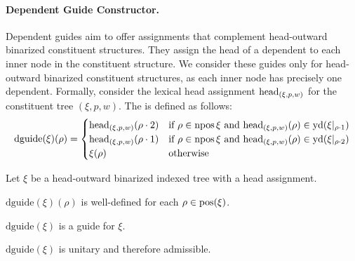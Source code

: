 \documentclass[../../document.tex]{subfiles}
\begin{document}
    \paragraph{Dependent Guide Constructor.}
    Dependent guides aim to offer assignments that complement head-outward binarized constituent structures.
    They assign the head of a dependent to each inner node in the constituent structure.
    We consider these guides only for head-outward binarized constituent structures, as each inner node has precisely one dependent.
    Formally, consider the lexical head assignment \(\operatorname{head}_{(\xi,p,w)}\) for the constituent tree \((\xi, p, w)\).
    The  is defined as follows:
    \[
        \mathrm{dguide}(\xi)(\rho) = \begin{cases}
            \operatorname{head}_{(\xi,p,w)}(\rho\cdot2) & \text{if $\rho \in \operatorname{npos}{\xi}$ and $\operatorname{head}_{(\xi,p,w)}(\rho) \in \operatorname{yd}(\xi|_{\rho\cdot 1})$} \\
            \operatorname{head}_{(\xi,p,w)}(\rho\cdot1) & \text{if $\rho \in \operatorname{npos}{\xi}$ and $\operatorname{head}_{(\xi,p,w)}(\rho) \in \operatorname{yd}(\xi|_{\rho\cdot 2})$} \\
            \xi(\rho) & \text{otherwise} \\
        \end{cases}
    \]

    \begin{claim}
        Let \(\xi\) be a head-outward binarized indexed tree with a head assignment.
        \begin{compactenum}
            \item \(\mathrm{dguide}(\xi)(\rho)\) is well-defined for each \(\rho \in \operatorname{pos}(\xi)\).
            \item \(\mathrm{dguide}(\xi)\) is a guide for \(\xi\).
            \item \(\mathrm{dguide}(\xi)\) is unitary and therefore admissible.
        \end{compactenum}
    \end{claim}
\end{document}
